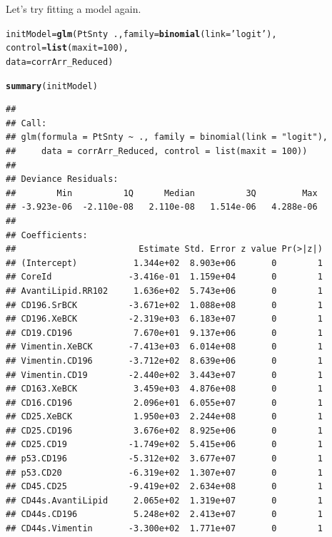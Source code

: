 \documentclass[a4paper]{article}\usepackage[]{graphicx}\usepackage[]{color}
\makeatletter
\newcommand{\hlnum}[1]{\textcolor[rgb]{0.686,0.059,0.569}{#1}}%
\newcommand{\hlstr}[1]{\textcolor[rgb]{0.192,0.494,0.8}{#1}}%
\newcommand{\hlopt}[1]{\textcolor[rgb]{0,0,0}{#1}}%
\newcommand{\hlstd}[1]{\textcolor[rgb]{0.345,0.345,0.345}{#1}}%
\newcommand{\hlkwb}[1]{\textcolor[rgb]{0.69,0.353,0.396}{#1}}%
\newcommand{\hlkwc}[1]{\textcolor[rgb]{0.333,0.667,0.333}{#1}}%
\newcommand{\hlkwd}[1]{\textcolor[rgb]{0.737,0.353,0.396}{\textbf{#1}}}%
\newenvironment{kframe}{%
 \def\at@end@of@kframe{}%
 \ifinner\ifhmode%
  \def\at@end@of@kframe{\end{minipage}}%
  \begin{minipage}{\columnwidth}%
 \fi\fi%
 \def\FrameCommand##1{\hskip\@totalleftmargin \hskip-\fboxsep
 \colorbox{shadecolor}{##1}\hskip-\fboxsep
     \hskip-\linewidth \hskip-\@totalleftmargin \hskip\columnwidth}%
 \MakeFramed {\advance\hsize-\width
   \@totalleftmargin\z@ \linewidth\hsize
   \@setminipage}}%
 {\par\unskip\endMakeFramed%
 \at@end@of@kframe}
\newenvironment{knitrout}{}{} %
\makeatother
\begin{document}
Let's try fitting a model again.
\begin{knitrout}
\color{fgcolor}\begin{kframe}
\begin{alltt}
\hlstd{initModel} \hlkwb{=} \hlkwd{glm}\hlstd{(PtSnty} \hlopt{~}\hlstd{.,}\hlkwc{family}\hlstd{=}\hlkwd{binomial}\hlstd{(}\hlkwc{link}\hlstd{=}\hlstr{'logit'}\hlstd{),}
                \hlkwc{control} \hlstd{=} \hlkwd{list}\hlstd{(}\hlkwc{maxit} \hlstd{=} \hlnum{100}\hlstd{),}
                \hlkwc{data}\hlstd{=corrArr_Reduced)}
\end{alltt}


{\ttfamily\noindent\color{warningcolor}{\#\# Warning: glm.fit: fitted probabilities numerically 0 or 1 occurred}}\begin{alltt}
\hlkwd{summary}\hlstd{(initModel)}
\end{alltt}
\begin{verbatim}
## 
## Call:
## glm(formula = PtSnty ~ ., family = binomial(link = "logit"), 
##     data = corrArr_Reduced, control = list(maxit = 100))
## 
## Deviance Residuals: 
##        Min          1Q      Median          3Q         Max  
## -3.923e-06  -2.110e-08   2.110e-08   1.514e-06   4.288e-06  
## 
## Coefficients:
##                        Estimate Std. Error z value Pr(>|z|)
## (Intercept)           1.344e+02  8.903e+06       0        1
## CoreId               -3.416e-01  1.159e+04       0        1
## AvantiLipid.RR102     1.636e+02  5.743e+06       0        1
## CD196.SrBCK          -3.671e+02  1.088e+08       0        1
## CD196.XeBCK          -2.319e+03  6.183e+07       0        1
## CD19.CD196            7.670e+01  9.137e+06       0        1
## Vimentin.XeBCK       -7.413e+03  6.014e+08       0        1
## Vimentin.CD196       -3.712e+02  8.639e+06       0        1
## Vimentin.CD19        -2.440e+02  3.443e+07       0        1
## CD163.XeBCK           3.459e+03  4.876e+08       0        1
## CD16.CD196            2.096e+01  6.055e+07       0        1
## CD25.XeBCK            1.950e+03  2.244e+08       0        1
## CD25.CD196            3.676e+02  8.925e+06       0        1
## CD25.CD19            -1.749e+02  5.415e+06       0        1
## p53.CD196            -5.312e+02  3.677e+07       0        1
## p53.CD20             -6.319e+02  1.307e+07       0        1
## CD45.CD25            -9.419e+02  2.634e+08       0        1
## CD44s.AvantiLipid     2.065e+02  1.319e+07       0        1
## CD44s.CD196           5.248e+02  2.413e+07       0        1
## CD44s.Vimentin       -3.300e+02  1.771e+07       0        1

\end{verbatim}
\end{kframe}
\end{knitrout}
\end{document}
